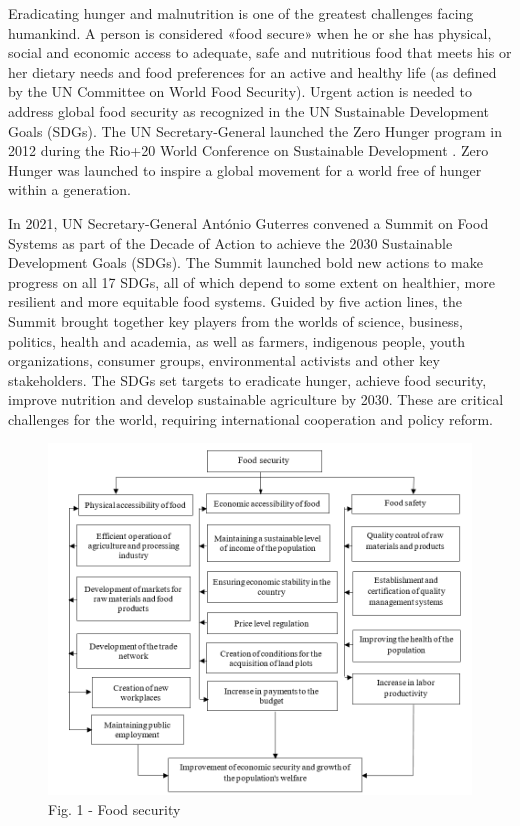 \begin{multicols}{2}
Eradicating hunger and malnutrition is one of the greatest challenges
facing humankind. A person is considered «food secure» when he or she
has physical, social and economic access to adequate, safe and
nutritious food that meets his or her dietary needs and food preferences
for an active and healthy life (as defined by the UN Committee on World
Food Security). Urgent action is needed to address global food security
as recognized in the UN Sustainable Development Goals (SDGs). The UN
Secretary-General launched the Zero Hunger program in 2012 during the
Rio+20 World Conference on Sustainable Development . Zero Hunger was
launched to inspire a global movement for a world free of hunger within
a generation.

In 2021, UN Secretary-General António Guterres convened a Summit on Food
Systems as part of the Decade of Action to achieve the 2030 Sustainable
Development Goals (SDGs). The Summit launched bold new actions to make
progress on all 17 SDGs, all of which depend to some extent on
healthier, more resilient and more equitable food systems. Guided by
five action lines, the Summit brought together key players from the
worlds of science, business, politics, health and academia, as well as
farmers, indigenous people, youth organizations, consumer groups,
environmental activists and other key stakeholders. The SDGs set targets
to eradicate hunger, achieve food security, improve nutrition and
develop sustainable agriculture by 2030. These are critical challenges
for the world, requiring international cooperation and policy reform.
\end{multicols}

\begin{figure}[H]
	\centering
	\includegraphics[width=\textwidth]{media/ekon/image7}
	\caption*{Fig. 1 - Food security}
\end{figure}

